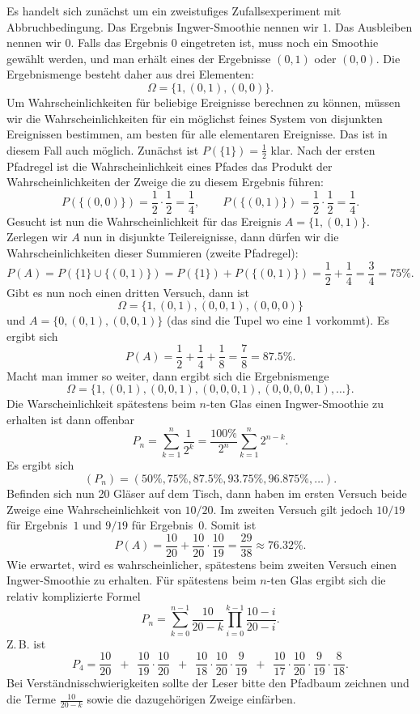 \documentclass[a4paper,10pt,fleqn,twoside]{scrartcl}
\numberwithin{equation}{section}
\newcommand{\strong}[1]{{\normalfont\sffamily\bfseries #1}}
\theoremstyle{Aufgabe}
\begin{document}
\noindent\strong{Lösung.}
Es handelt sich zunächst um ein zweistufiges Zufallsexperiment
mit Abbruchbedingung. Das Ergebnis Ingwer-Smoothie nennen wir $1$.
Das Ausbleiben nennen wir $0$. Falls das Ergebnis $0$ eingetreten ist,
muss noch ein Smoothie gewählt werden, und man erhält eines der
Ergebnisse $(0,1)$ oder $(0,0)$. Die Ergebnismenge besteht daher
aus drei Elementen:
\[\Omega = \{1,(0,1),(0,0)\}.\]
Um Wahrscheinlichkeiten für beliebige Ereignisse berechnen zu können,
müssen wir die Wahrscheinlichkeiten für ein möglichst feines System
von disjunkten Ereignissen bestimmen, am besten für alle elementaren
Ereignisse. Das ist in diesem Fall auch möglich. Zunächst ist
$P(\{1\})=\frac{1}{2}$ klar. Nach der ersten Pfadregel ist die
Wahrscheinlichkeit eines Pfades das Produkt der
Wahrscheinlichkeiten der Zweige die zu diesem Ergebnis führen:%
\[P(\{(0,0)\}) = \frac{1}{2}\cdot\frac{1}{2} = \frac{1}{4},\qquad
P(\{(0,1)\}) = \frac{1}{2}\cdot\frac{1}{2} = \frac{1}{4}.
\]
Gesucht ist nun die Wahrscheinlichkeit für das Ereignis
$A=\{1,(0,1)\}$. Zerlegen wir $A$ nun in disjunkte Teilereignisse,
dann dürfen wir die Wahrscheinlichkeiten dieser Summieren (zweite
Pfadregel):
\[P(A) = P(\{1\}\cup\{(0,1)\}) = P(\{1\})+P(\{(0,1)\})
= \frac{1}{2}+\frac{1}{4} = \frac{3}{4} = 75\%.\]
Gibt es nun noch einen dritten Versuch, dann ist
\[\Omega = \{1,(0,1),(0,0,1),(0,0,0)\}\]
und $A=\{0,(0,1),(0,0,1)\}$ (das sind die Tupel wo eine 1 vorkommt).
Es ergibt sich
\[P(A) = \frac{1}{2}+\frac{1}{4}+\frac{1}{8} = \frac{7}{8} = 87.5\%.\]
Macht man immer so weiter, dann ergibt sich die Ergebnismenge
\[\Omega = \{1,(0,1),(0,0,1),(0,0,0,1),(0,0,0,0,1),\ldots\}.\]
Die Warscheinlichkeit spätestens beim $n$-ten Glas einen Ingwer-Smoothie
zu erhalten ist dann offenbar
\[P_n = \sum_{k=1}^n \frac{1}{2^k} = \frac{100\%}{2^n}\sum_{k=1}^n 2^{n-k}.\]
Es ergibt sich
\[(P_n) = (50\%,75\%,87.5\%,93.75\%,96.875\%,\ldots).\]
Befinden sich nun 20 Gläser auf dem Tisch, dann haben im ersten
Versuch beide Zweige eine Wahrscheinlichkeit von $10/20$. Im
zweiten Versuch gilt jedoch $10/19$ für Ergebnis~$1$ und $9/19$ für
Ergebnis~$0$. Somit ist
\[P(A) = \frac{10}{20}+\frac{10}{20}\cdot\frac{10}{19}
= \frac{29}{38} \approx 76.32\%.\]
Wie erwartet, wird es wahrscheinlicher, spätestens beim zweiten
Versuch einen Ingwer-Smoothie zu erhalten. Für spätestens beim $n$-ten
Glas ergibt sich die relativ komplizierte Formel
\[P_n = \sum_{k=0}^{n-1} \frac{10}{20-k}\prod_{i=0}^{k-1} \frac{10-i}{20-i}.\]
Z.\,B. ist
\[P_4 = \frac{10}{20}\enspace +\enspace\frac{10}{19}\cdot \frac{10}{20}
\enspace +\enspace\frac{10}{18}\cdot\frac{10}{20}\cdot\frac{9}{19}
\enspace +\enspace\frac{10}{17}\cdot\frac{10}{20}\cdot\frac{9}{19}\cdot\frac{8}{18}.\]
Bei Verständnisschwierigkeiten sollte der Leser bitte den Pfadbaum
zeichnen und die Terme $\frac{10}{20-k}$ sowie die dazugehörigen
Zweige einfärben.
\end{document}
